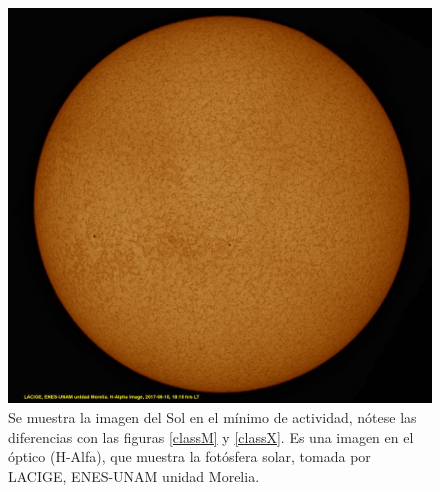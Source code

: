 \begin{figure}[H]
  \centering
    \includegraphics[scale=0.2]{Apendice1/figs/sol_compuesta.pdf}      %
  \caption[El Sol con baja actividad]{Se muestra la imagen del Sol en el mínimo de actividad, nótese las diferencias con las figuras \ref{classM} y \ref{classX}. Es una imagen en el óptico (H-Alfa), que muestra la fotósfera solar, tomada por LACIGE, ENES-UNAM unidad Morelia.}            %
  \label{minima_act}                            %
\end{figure}


